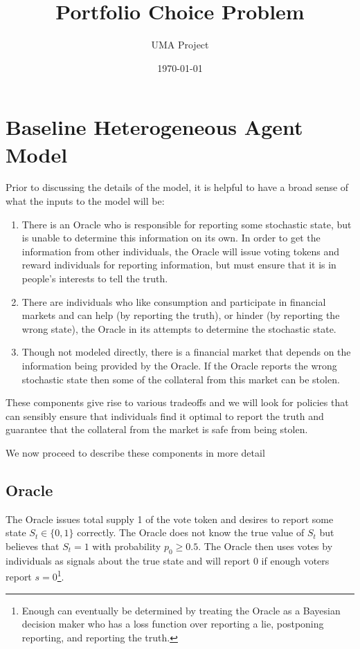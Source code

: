 \documentclass[12pt]{article}
\title{Portfolio Choice Problem}
\author{UMA Project}
\date{\today}
\begin{document}
\maketitle


\section{Baseline Heterogeneous Agent Model}

  Prior to discussing the details of the model, it is helpful to have a broad sense of what the
  inputs to the model will be:

  \begin{enumerate}
    \item There is an Oracle who is responsible for reporting some stochastic state, but is unable
          to determine this information on its own. In order to get the information from other
          individuals, the Oracle will issue voting tokens and reward individuals for reporting
          information, but must ensure that it is in people's interests to tell the truth.
    \item There are individuals who like consumption and participate in financial markets and can
          help (by reporting the truth), or hinder (by reporting the wrong state), the Oracle in its
          attempts to determine the stochastic state.
    \item Though not modeled directly, there is a financial market that depends on the information
          being provided by the Oracle. If the Oracle reports the wrong stochastic state then some
          of the collateral from this market can be stolen.
  \end{enumerate}

  These components give rise to various tradeoffs and we will look for policies that can sensibly
  ensure that individuals find it optimal to report the truth and guarantee that the collateral
  from the market is safe from being stolen.

  We now proceed to describe these components in more detail

  \subsection{Oracle}

    The Oracle issues total supply 1 of the vote token and desires to report some state
    $S_t \in \{0, 1\}$ correctly. The Oracle does not know the true value of $S_t$ but believes that
    $S_t = 1$ with probability $p_0 \geq 0.5$. The Oracle then uses votes by individuals as signals
    about the true state and will report $0$ if enough voters report $s = 0$\footnote{Enough can
    eventually be determined by treating the Oracle as a Bayesian decision maker who has a loss
    function over reporting a lie, postponing reporting, and reporting the truth.}.
\end{document}
